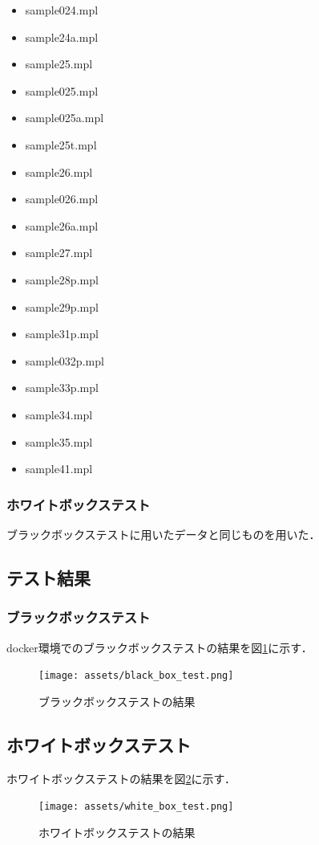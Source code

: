 \documentclass{jlreq}
\begin{document}
\begin{itemize}
  \item sample024.mpl
  \item sample24a.mpl
  \item sample25.mpl
  \item sample025.mpl
  \item sample025a.mpl
  \item sample25t.mpl
  \item sample26.mpl
  \item sample026.mpl
  \item sample26a.mpl
  \item sample27.mpl
  \item sample28p.mpl
  \item sample29p.mpl
  \item sample31p.mpl
  \item sample032p.mpl
  \item sample33p.mpl
  \item sample34.mpl
  \item sample35.mpl
  \item sample41.mpl
\end{itemize}

\subsubsection{ホワイトボックステスト}
ブラックボックステストに用いたデータと同じものを用いた．

\subsection{テスト結果}
\subsubsection{ブラックボックステスト}
docker環境でのブラックボックステストの結果を図\ref{fig:black_box_test}に示す．
\begin{figure}[H]
  \centering
  \texttt{[image: assets/black\_box\_test.png]}
  \caption{ブラックボックステストの結果}
  \label{fig:black_box_test}
\end{figure}

\subsection{ホワイトボックステスト}
ホワイトボックステストの結果を図\ref{fig:white_box_test}に示す．
\begin{figure}[H]
  \centering
  \texttt{[image: assets/white\_box\_test.png]}
  \caption{ホワイトボックステストの結果}
  \label{fig:white_box_test}
\end{figure}
\end{document}
